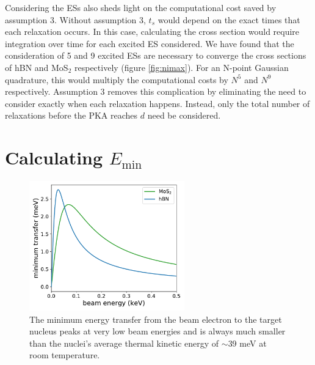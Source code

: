 \documentclass{article}
\begin{document}
Considering the ESs also sheds light on the computational cost saved by
assumption 3.
Without assumption 3, $t_s$ would depend on the exact times that each
relaxation occurs.
In this case, calculating the cross section would require integration over time
for each excited ES considered.
We have found that the consideration of 5 and 9 excited ESs are necessary to
converge the cross sections of hBN and MoS$_2$ respectively (figure
\ref{fig:nimax}).
For an N-point Gaussian quadrature, this would multiply the computational costs
by $N^5$ and $N^9$ respectively.
Assumption 3 removes this complication by eliminating the need to consider
exactly when each relaxation happens.
Instead, only the total number of relaxations before the PKA reaches $d$ need
be considered.

\pagebreak
\section{Calculating $E_\text{min}$}
\label{app:Emin}

\begin{figure}[H]
  \centering
  \includegraphics[width=0.6\textwidth]{figures/emin.pdf}
  \caption{
    The minimum energy transfer from the beam electron to the target nucleus
    peaks at very low beam energies and is always much smaller than the
    nuclei's average thermal kinetic energy of $\sim$39 meV at room
    temperature. 
  }
  \label{fig:Emin}
\end{figure}
\end{document}
